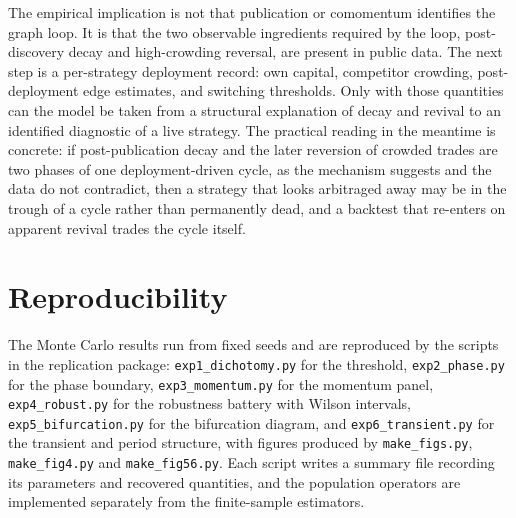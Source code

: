\documentclass[11pt]{article}
\theoremstyle{plain}
\theoremstyle{definition}
\begin{document}
The empirical implication is not that publication or comomentum identifies the graph loop. It is that the two observable ingredients required by the loop, post-discovery decay and high-crowding reversal, are present in public data. The next step is a per-strategy deployment record: own capital, competitor crowding, post-deployment edge estimates, and switching thresholds. Only with those quantities can the model be taken from a structural explanation of decay and revival to an identified diagnostic of a live strategy. The practical reading in the meantime is concrete: if post-publication decay and the later reversion of crowded trades are two phases of one deployment-driven cycle, as the mechanism suggests and the data do not contradict, then a strategy that looks arbitraged away may be in the trough of a cycle rather than permanently dead, and a backtest that re-enters on apparent revival trades the cycle itself.

\section*{Reproducibility}\label{sec:repro}
The Monte Carlo results run from fixed seeds and are reproduced by the scripts in the replication package: \texttt{exp1\_dichotomy.py} for the threshold, \texttt{exp2\_phase.py} for the phase boundary, \texttt{exp3\_momentum.py} for the momentum panel, \texttt{exp4\_robust.py} for the robustness battery with Wilson intervals, \texttt{exp5\_bifurcation.py} for the bifurcation diagram, and \texttt{exp6\_transient.py} for the transient and period structure, with figures produced by \texttt{make\_figs.py}, \texttt{make\_fig4.py} and \texttt{make\_fig56.py}. Each script writes a summary file recording its parameters and recovered quantities, and the population operators are implemented separately from the finite-sample estimators.
\end{document}
